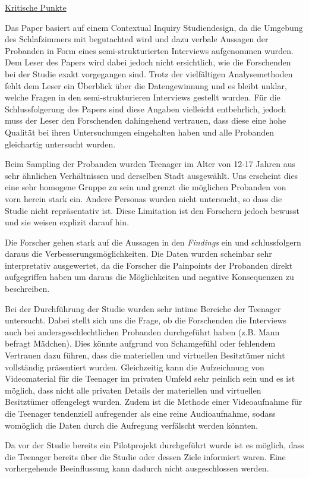 \documentclass{hsflensburg}
\begin{document}
	\underline{Kritische Punkte}

	Das Paper basiert auf einem Contextual Inquiry Studiendesign, da die Umgebung des Schlafzimmers mit begutachted wird und dazu verbale Aussagen der Probanden in Form eines semi-strukturierten Interviews aufgenommen wurden. Dem Leser des Papers wird dabei jedoch nicht ersichtlich, wie die Forschenden bei der Studie exakt vorgegangen sind. Trotz der vielfältigen Analysemethoden fehlt dem Leser ein Überblick über die Datengewinnung und es bleibt unklar, welche Fragen in den semi-strukturieren Interviews gestellt wurden. Für die Schlussfolgerung des Papers sind diese Angaben vielleicht entbehrlich, jedoch muss der Leser den Forschenden dahingehend vertrauen, dass diese eine hohe Qualität bei ihren Untersuchungen eingehalten haben und alle Probanden gleichartig untersucht wurden.
	
	Beim Sampling der Probanden wurden Teenager im Alter von 12-17 Jahren aus sehr ähnlichen Verhältnissen und derselben Stadt ausgewählt. Uns erscheint dies eine sehr homogene Gruppe zu sein und grenzt die möglichen Probanden von vorn herein stark ein. Andere Personas wurden nicht untersucht, so dass die Studie nicht repräsentativ ist. Diese Limitation ist den Forschern jedoch bewusst und sie weisen explizit darauf hin. 

	Die Forscher gehen stark auf die Aussagen in den \textit{Findings} ein und schlussfolgern daraus die Verbesserungsmöglichkeiten. Die Daten wurden scheinbar sehr interpretativ ausgewertet, da die Forscher die Painpoints der Probanden direkt aufgegriffen haben um daraus die Möglichkeiten und negative Konsequenzen zu beschreiben.

	Bei der Durchführung der Studie wurden sehr intime Bereiche der Teenager untersucht. Dabei stellt sich uns die Frage, ob die Forschenden die Interviews auch bei andersgeschlechtlichen Probanden durchgeführt haben (z.B. Mann befragt Mädchen). Dies könnte aufgrund von Schamgefühl oder fehlendem Vertrauen dazu führen, dass die materiellen und virtuellen Besitztümer nicht vollständig präsentiert wurden. Gleichzeitig kann die Aufzeichnung von Videomaterial für die Teenager im privaten Umfeld sehr peinlich sein und es ist möglich, dass nicht alle privaten Details der materiellen und virtuellen Besitztümer offengelegt wurden. Zudem ist die Methode einer Videoaufnahme für die Teenager tendenziell aufregender als eine reine Audioaufnahme, sodass womöglich die Daten durch die Aufregung verfälscht werden könnten. 

	Da vor der Studie bereits ein Pilotprojekt durchgeführt wurde ist es möglich, dass die Teenager bereits über die Studie oder dessen Ziele informiert waren. Eine vorhergehende Beeinflussung kann dadurch nicht ausgeschlossen werden. 
\end{document}
